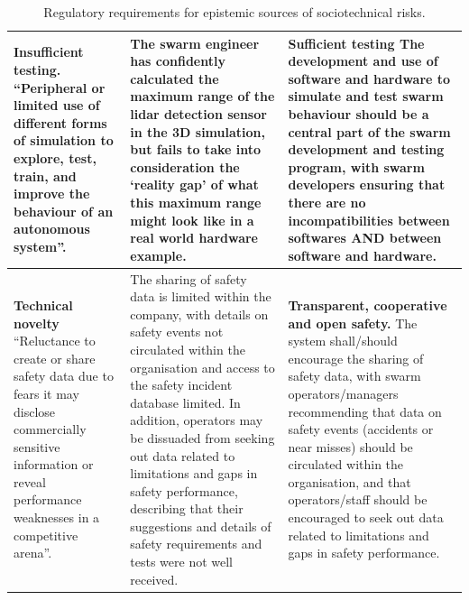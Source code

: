 \documentclass[lettersize,journal]{IEEEtran}
\begin{document}
\begin{landscape}
\begin{table}[]
\begin{tabular}{|p{0.3\textheight}|p{0.35\textheight}|p{0.35\textheight}|}
         \hline
         \textbf{Insufficient testing.} ``Peripheral or limited use of different forms of simulation to explore, test, train, and improve the behaviour of an autonomous system”. \cite{macrae2021learning} & The swarm engineer has confidently calculated the maximum range of the lidar detection sensor in the 3D simulation, but fails to take into consideration the ‘reality gap’ of what this maximum range might look like in a real world hardware example. & \textbf{Sufficient testing} The development and use of software and hardware to simulate and test swarm behaviour should be a central part of the swarm development and testing program, with swarm developers ensuring that there are no incompatibilities between softwares AND between software and hardware. \\
         \hline
         \textbf{Technical novelty} ``Reluctance to create or share safety data due to fears it may disclose commercially sensitive information or reveal performance weaknesses in a competitive arena”. \cite{macrae2021learning} & The sharing of safety data is limited within the company, with details on safety events not circulated within the organisation and access to the safety incident database limited. In addition, operators may be dissuaded from seeking out data related to limitations and gaps in safety performance, describing that their suggestions and details of safety requirements and tests were not well received. & \textbf{Transparent, cooperative and open safety.} The system shall/should encourage the sharing of safety data, with swarm operators/managers recommending that data on safety events (accidents or near misses) should be circulated within the organisation, and that operators/staff should be encouraged to seek out data related to limitations and gaps in safety performance.\\
         \hline
    \end{tabular}
    \caption{Regulatory requirements for epistemic sources of sociotechnical risks.}%
    \label{tab:reg_4}
\end{table}
\end{landscape}
\end{document}
